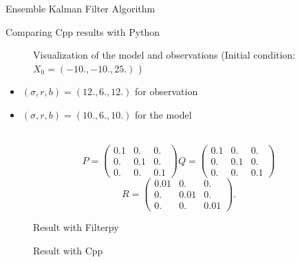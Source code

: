 \begin{frame}{Ensemble Kalman Filter Algorithm}
    \begin{figure}[H]
	\end{figure}
\end{frame}

\begin{frame}[allowframebreaks]{Comparing Cpp results with Python}
	\begin{minipage}{0.4\hsize}
		\centering
		\begin{figure}[H]
			\caption{Visualization of the model and observations (Initial condition: $X_0=(-10.,-10.,25.) $ )}
		\end{figure}
	\end{minipage} \quad
	\begin{minipage}{0.5\hsize}
		\begin{itemize}
			\item $(\sigma, r, b)=(12.,6.,12.)$ for observation
			\item $(\sigma, r, b)=(10.,6.,10.)$ for the model
		\end{itemize}
		\; \\
		$$P=\begin{pmatrix}
			0.1 & 0. & 0. \\
			0. & 0.1 & 0. \\
			0. & 0. & 0.1
		\end{pmatrix}
		Q=\begin{pmatrix}
			0.1 & 0. & 0. \\
			0. & 0.1 & 0. \\
			0. & 0. & 0.1
		\end{pmatrix}$$
		$$R=\begin{pmatrix}
			0.01 & 0. & 0. \\
			0. & 0.01 & 0. \\
			0. & 0. & 0.01
		\end{pmatrix}.$$ 
	\end{minipage}

	\newpage
	
	\begin{figure}[H]
		\centering
		\caption{Result with Filterpy}
	\end{figure}
	
	\newpage
	
	\begin{figure}[H]
		\centering
		\caption{Result with Cpp}
	\end{figure}
\end{frame}

